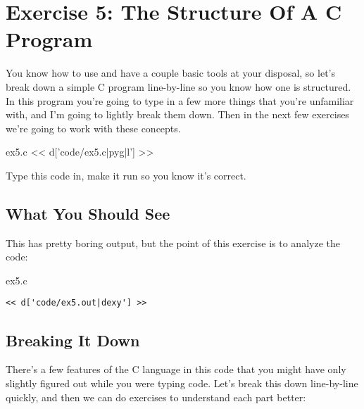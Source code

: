 \chapter{Exercise 5: The Structure Of A C Program}

You know how to use  and have a couple basic tools
at your disposal, so let's break down a simple C program line-by-line
so you know how one is structured.  In this program you're going to
type in a few more things that you're unfamiliar with, and I'm going
to lightly break them down.  Then in the next few exercises we're 
going to work with these concepts.

\begin{code}{ex5.c}
<< d['code/ex5.c|pyg|l'] >>
\end{code}

Type this code in, make it run so you know it's correct.

\section{What You Should See}

This has pretty boring output, but the point of this exercise is
to analyze the code:

\begin{code}{ex5.c}
\begin{lstlisting}
<< d['code/ex5.out|dexy'] >>
\end{lstlisting}
\end{code}


\section{Breaking It Down}

There's a few features of the C language in this code that you 
might have only slightly figured out while you were typing code.
Let's break this down line-by-line quickly, and then we can do
exercises to understand each part better:

